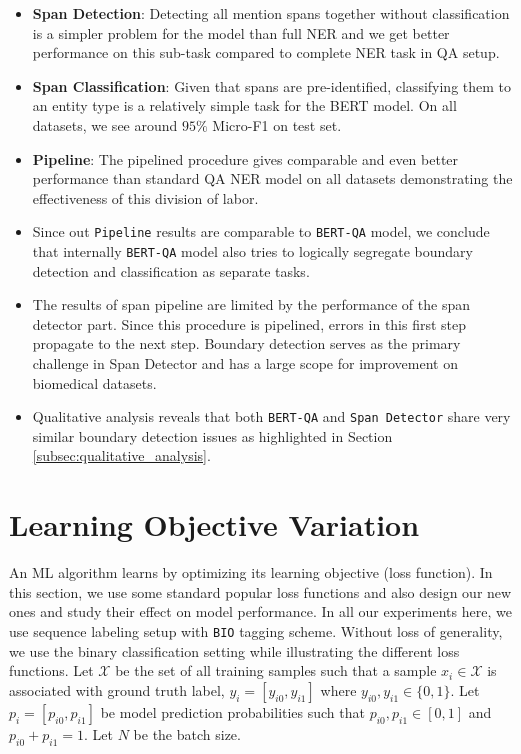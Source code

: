 \begin{itemize}
    \item \textbf{Span Detection}: Detecting all mention spans together without classification is a simpler problem for the model than full NER and we get better performance on this sub-task compared to complete NER task in QA setup.
    
    \item \textbf{Span Classification}: Given that spans are pre-identified, classifying them to an entity type is a relatively simple task for the BERT model. On all datasets, we see around $95\%$ Micro-F1 on test set.
    
    \item \textbf{Pipeline}: The pipelined procedure gives comparable and even better performance than standard QA NER model on all datasets demonstrating the effectiveness of this division of labor. 
    
    \item Since out \texttt{Pipeline} results are comparable to \texttt{BERT-QA} model, we conclude that internally \texttt{BERT-QA} model also tries to logically segregate boundary detection and classification as separate tasks.
    
    \item The results of span pipeline are limited by the performance of the span detector part. Since this procedure is pipelined, errors in this first step propagate to the next step. Boundary detection serves as the primary challenge in Span Detector and has a large scope for improvement on biomedical datasets.
    
    \item Qualitative analysis reveals that both \texttt{BERT-QA} and \texttt{Span Detector} share very similar boundary detection issues as highlighted in Section \ref{subsec:qualitative_analysis}.
\end{itemize}

\section{Learning Objective Variation}
An ML algorithm learns by optimizing its learning objective (loss function). In this section, we use some standard popular loss functions and also design our new ones and study their effect on model performance. In all our experiments here, we use sequence labeling setup with \texttt{BIO} tagging scheme. Without loss of generality, we use the binary classification setting while illustrating the different loss functions. Let $\mathcal{X}$ be the set of all training samples such that a sample $x_i \in \mathcal{X}$ is associated with ground truth label, $y_i = [y_{i0}, y_{i1}]$ where $y_{i0}, y_{i1} \in \{0, 1\}$. Let $p_i = [p_{i0}, p_{i1}]$ be model prediction probabilities such that $p_{i0}, p_{i1} \in [0, 1]$ and $p_{i0} + p_{i1} = 1$. Let $N$ be the batch size.

